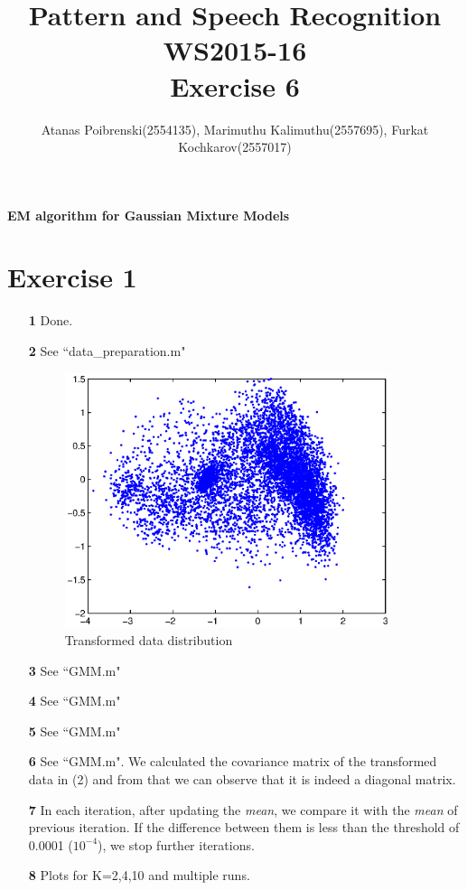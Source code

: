 \documentclass[a4paper]{article}
\title{Pattern and Speech Recognition WS2015-16 \\ Exercise 6}
\author{Atanas Poibrenski(2554135), Marimuthu Kalimuthu(2557695), Furkat Kochkarov(2557017)}
\begin{document}
\maketitle 
\begin{center}
	\textbf{EM algorithm for Gaussian Mixture Models}
\end{center}

\section*{Exercise 1}
\begin{enumerate}
	\item[ \textbf{1} ] Done.
	\item[ \textbf{2} ] See ``data\_preparation.m"

	\begin{figure}[H]
		\begin{center}
			\includegraphics[width=0.9\textwidth]{data_plot.eps}
			\caption{Transformed data distribution}\label{fig:transdata}
		\end{center}
	\end{figure}

	\item[ \textbf{3} ] See ``GMM.m"
	\item[ \textbf{4} ] See ``GMM.m"
	\item[ \textbf{5} ] See ``GMM.m"
	\item[ \textbf{6} ] See ``GMM.m". We calculated the covariance matrix of the transformed data in (2) and from that we can observe that it is indeed a diagonal matrix.
	\item[ \textbf{7} ] In each iteration, after updating the \textit{mean}, we compare it with the \textit{mean} of previous iteration. If the difference between them is less than the threshold of 0.0001 ($10^{-4}$), we stop further iterations.
	\item[ \textbf{8} ] Plots for K={2,4,10} and multiple runs.
	

\end{enumerate}
\end{document}
